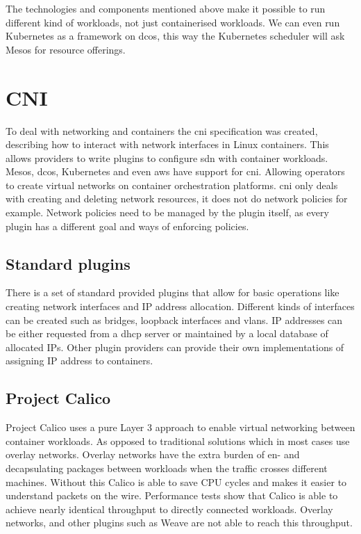 The technologies and components mentioned above make it possible to run different kind of workloads, not just containerised workloads. We can even run Kubernetes as a framework on \gls{dcos}, this way the Kubernetes scheduler will ask Mesos for resource offerings.

\section{CNI}
\label{sec:cni}
To deal with networking and containers the \gls{cni} specification was created, describing how to interact with network interfaces in Linux containers. This allows providers to write plugins to configure \gls{sdn} with container workloads. Mesos, \gls{dcos}, Kubernetes and even \gls{aws} have support for \gls{cni}. Allowing operators to create virtual networks on container orchestration platforms.
\Gls{cni} only deals with creating and deleting network resources, it does not do network policies for example. Network policies need to be managed by the plugin itself, as every plugin has a different goal and ways of enforcing policies.

\subsection{Standard plugins}
\label{subsec:plugins}
There is a set of standard provided plugins\cite{cni_plugin} that allow for basic operations like creating network interfaces and IP address allocation. Different kinds of interfaces can be created such as bridges, loopback interfaces and \glspl{vlan}. IP addresses can be either requested from a \gls{dhcp} server or maintained by a local database of allocated IPs. Other plugin providers can provide their own implementations of assigning IP address to containers.

\subsection{Project Calico}
\label{subsec:calico}
Project Calico uses a pure Layer 3 approach to enable virtual networking between container workloads. As opposed to traditional solutions which in most cases use overlay networks. Overlay networks have the extra burden of en- and decapsulating packages between workloads when the traffic crosses different machines. Without this Calico is able to save CPU cycles and makes it easier to understand packets on the wire. Performance tests\cite{dzone, dataplane, chunqi} show that Calico is able to achieve nearly identical throughput to directly connected workloads. Overlay networks, and other plugins such as Weave\cite{weave} are not able to reach this throughput.


